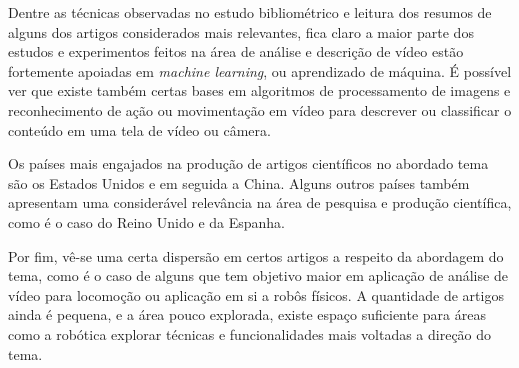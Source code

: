 Dentre as técnicas observadas no estudo bibliométrico e leitura dos resumos de alguns dos artigos considerados mais relevantes, fica claro a maior parte dos estudos e experimentos feitos na área de análise e descrição de vídeo estão fortemente apoiadas em \textit{machine learning}, ou aprendizado de máquina. É possível ver que existe também certas bases em algoritmos de processamento de imagens e reconhecimento de ação ou movimentação em vídeo para descrever ou classificar o conteúdo em uma tela de vídeo ou câmera.

Os países mais engajados na produção de artigos científicos no abordado tema são os Estados Unidos e em seguida a China. Alguns outros países também apresentam uma considerável relevância na área de pesquisa e produção científica, como é o caso do Reino Unido e da Espanha.

Por fim, vê-se uma certa dispersão em certos artigos a respeito da abordagem do tema, como é o caso de alguns que tem objetivo maior em aplicação de análise de vídeo para locomoção ou aplicação em si a robôs físicos. A quantidade de artigos ainda é pequena, e a área pouco explorada, existe espaço suficiente para áreas como a robótica explorar técnicas e funcionalidades mais voltadas a direção do tema.
